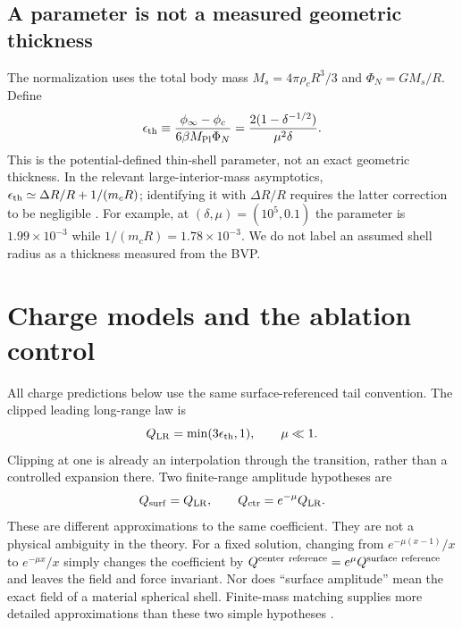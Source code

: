 \documentclass[11pt,a4paper]{article}
\begin{document}
\subsection{A parameter is not a measured geometric thickness}
The normalization uses the total body mass
$M_s=4\pi\rho_cR^3/3$ and $\Phi_N=GM_s/R$. Define
\begin{equation}
 \epsilon_{\mathrm{th}}\equiv\frac{\phi_\infty-\phi_c}{6\beta M_{\mathrm{Pl}}\Phi_N}
 =\frac{2(1-\delta^{-1/2})}{\mu^2\delta}.
 \label{eq:eps}
\end{equation}
This is the potential-defined thin-shell parameter, not an exact geometric
thickness. In the relevant large-interior-mass asymptotics,
$\epsilon_{\mathrm{th}}\simeq\Delta R/R+1/(m_cR)$; identifying it with $\Delta R/R$ requires
the latter correction to be negligible \cite{TamakiTsujikawa}.
For example, at $(\delta,\mu)=(10^5,0.1)$ the parameter is $1.99\times10^{-3}$
while $1/(m_cR)=1.78\times10^{-3}$. We do not label an assumed shell radius
as a thickness measured from the BVP.

\section{Charge models and the ablation control}
All charge predictions below use the same surface-referenced tail convention.
The clipped leading long-range law is
\begin{equation}
 Q_{\mathrm{LR}}=\min(3\epsilon_{\mathrm{th}},1),\qquad \mu\ll1.
\end{equation}
Clipping at one is already an interpolation through the transition, rather
than a controlled expansion there. Two finite-range amplitude hypotheses are
\begin{equation}
 Q_{\mathrm{surf}}=Q_{\mathrm{LR}},\qquad Q_{\mathrm{ctr}}=e^{-\mu}Q_{\mathrm{LR}}.
\end{equation}
These are different approximations to the same coefficient. They are not a
physical ambiguity in the theory. For a fixed solution, changing from
$e^{-\mu(x-1)}/x$ to $e^{-\mu x}/x$ simply changes the coefficient by
$Q^{\rm center\ reference}=e^\mu Q^{\rm surface\ reference}$ and leaves
the field and force invariant. Nor does ``surface amplitude'' mean the exact
field of a material spherical shell. Finite-mass matching supplies more detailed
approximations than these two simple hypotheses \cite{TamakiTsujikawa}.
\end{document}
